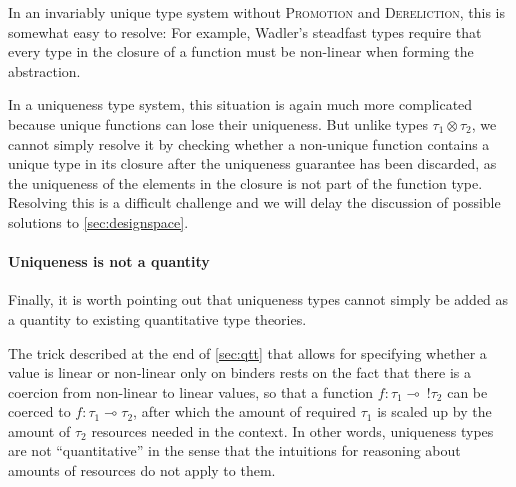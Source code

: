In an invariably unique type system without \textsc{Promotion} and \textsc{Dereliction}, this is somewhat easy to resolve: For example, Wadler's steadfast types require that every type in the closure of a function must be non-linear when forming the abstraction.

In a uniqueness type system, this situation is again much more complicated because unique functions can lose their uniqueness. But unlike types $\tau_1 \otimes \tau_2$, we cannot simply resolve it by checking whether a non-unique function contains a unique type in its closure after the uniqueness guarantee has been discarded, as the uniqueness of the elements in the closure is not part of the function type. Resolving this is a difficult challenge and we will delay the discussion of possible solutions to \cref{sec:designspace}.

\paragraph{Uniqueness is not a quantity} Finally, it is worth pointing out that uniqueness types cannot simply be added as a quantity to existing quantitative type theories. 

The trick described at the end of \cref{sec:qtt} that allows for specifying whether a value is linear or non-linear only on binders rests on the fact that there is a coercion from non-linear to linear values, so that a function $f : \tau_1 \multimap\ !\tau_2$ can be coerced to $f : \tau_1 \multimap \tau_2$, after which the amount of required $\tau_1$ is scaled up by the amount of $\tau_2$ resources needed in the context. In other words, uniqueness types are not ``quantitative'' in the sense that the intuitions for reasoning about amounts of resources do not apply to them.


